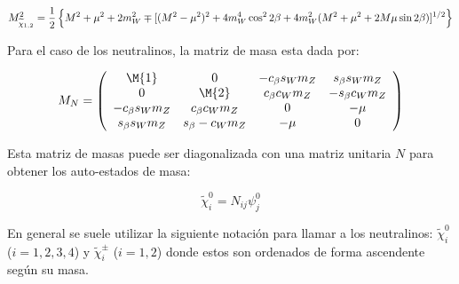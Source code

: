 \begin{equation}
  M^2_{\widetilde{\chi}_{1,2}} = \frac{1}{2} \left\{ M^2 + \mu^2 + 2 m_W^2 \mp
  [(M^2-\mu^2)^2 + 4 m_W^4 \cos^2 2\beta + 4 m_W^2 (M^2+\mu^2 + 2 M \mu \sin
    2\beta)]^{1/2} \right\}
\end{equation}



Para el caso de los neutralinos, la matriz de masa esta dada por:

\begin{equation}
  M_{N} = \left(
  \begin{array}{cccc}
    \M{1} & 0 & -c_\beta s_W m_Z & s_\beta s_W m_Z \\ 0 & \M{2} & c_\beta c_W
    m_Z & -s_\beta c_W m_Z \\

    -c_\beta s_W m_Z & c_\beta c_W m_Z & 0 & -\mu \\ s_\beta s_W m_Z & s_\beta
    -c_W m_Z & -\mu & 0 \\
  \end{array}
  \right)
\end{equation}

Esta matriz de masas puede ser diagonalizada con una matriz unitaria $N$ para
obtener los auto-estados de masa:

\begin{equation}
  \tilde{\chi}^0_i = N_{ij} \psi^0_j
\end{equation}

En general se suele utilizar la siguiente notación para llamar a los
neutralinos: $\tilde{\chi}^0_{i}$ ($i=1,2,3,4$) y $\tilde{\chi}^{\pm}_{i}$
($i=1,2$) donde estos son ordenados de forma ascendente según su masa.



